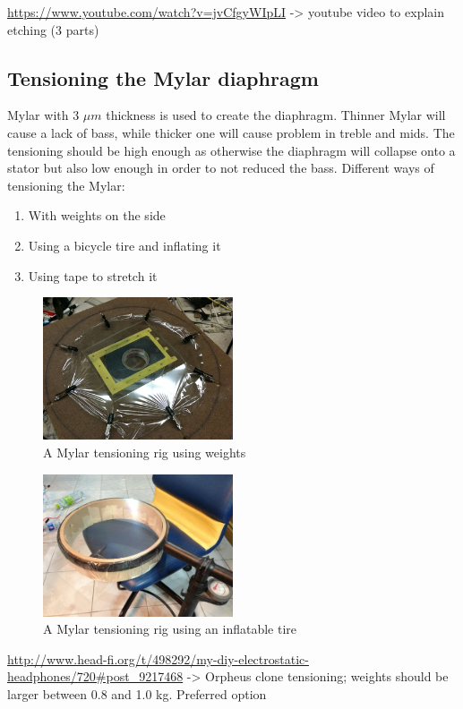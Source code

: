 \documentclass{article}
\begin{document}
\url{https://www.youtube.com/watch?v=jvCfgyWIpLI} -> youtube video to explain etching (3 parts)

\subsection{Tensioning the Mylar diaphragm}
\label{s:driver:tension}
Mylar with 3 $\mu m$ thickness is used to create the diaphragm. Thinner Mylar will cause a lack of bass, while thicker one will cause problem in treble and mids. The tensioning should be high enough as otherwise the diaphragm will collapse onto a stator but also low enough in order to not reduced the bass.
Different ways of tensioning the Mylar:
\begin{enumerate}
    \item With weights on the side
    \item Using a bicycle tire and inflating it
    \item Using tape to stretch it
\end{enumerate}
\begin{figure}[htb]
    \centering
    \includegraphics[width=0.5\textwidth]{images/mylar-tension-weight.png}
    \caption{A Mylar tensioning rig using weights}
    \label{f:driver:tension:weight}
\end{figure}
\begin{figure}[htb]
    \centering
    \includegraphics[width=0.5\textwidth]{images/mylar-tension-tire.png}
    \caption{A Mylar tensioning rig using an inflatable tire}
    \label{f:driver:tension:tire}
\end{figure}
\url{http://www.head-fi.org/t/498292/my-diy-electrostatic-headphones/720#post_9217468} -> Orpheus clone tensioning; weights should be larger between 0.8 and 1.0 kg. Preferred option
\end{document}
